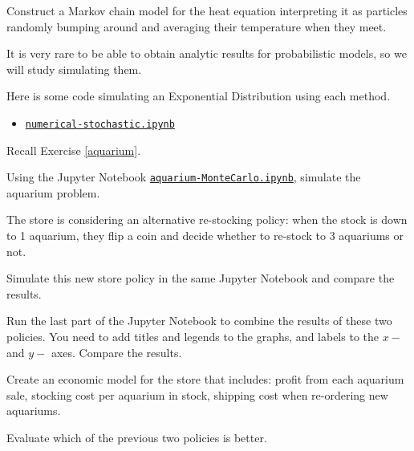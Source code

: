 \begin{slide}
\question

Construct a Markov chain model for the heat equation interpreting it as particles randomly bumping around and averaging their temperature when they meet.

	
\end{slide}




\begin{slide}
\question
\begin{problem}
It is very rare to be able to obtain analytic results for probabilistic models, so we will study simulating them.
\end{problem}



Here is some code simulating an Exponential Distribution using each method.
\begin{itemize}
	\item \href{https://utoronto.syzygy.ca/jupyter/user-redirect/git-pull?repo=https://github.com/bigfatbernie/IBLMathModeling&subPath=book/python/numerical-stochastic.ipynb}{\tt numerical-stochastic.ipynb}
\end{itemize}

	
\end{slide}



\begin{slide}
\question \label{aquarium2}

Recall Exercise \ref{aquarium}. 

\begin{parts}
	\item Using the Jupyter Notebook 	\href{https://utoronto.syzygy.ca/jupyter/user-redirect/git-pull?repo=https://github.com/bigfatbernie/IBLMathModeling&subPath=book/python/aquarium-part2.ipynb}{\tt aquarium-MonteCarlo.ipynb}, simulate the aquarium problem.

	\item The store is considering an alternative re-stocking policy: when the stock is down to 1 aquarium, they flip a coin and decide whether to re-stock to 3 aquariums or not.
	
	Simulate this new store policy in the same Jupyter Notebook and compare the results.
	
	\item Run the last part of the Jupyter Notebook to combine the results of these two policies. You need to add titles and legends to the graphs, and labels to the $x-$ and $y-$ axes. Compare the results.

	\item \label{aquarium2:economic} Create an economic model for the store that includes: profit from each aquarium sale, stocking cost per aquarium in stock, shipping cost when re-ordering new aquariums.
	
		Evaluate which of the previous two policies is better. 
\end{parts}

\end{slide}



